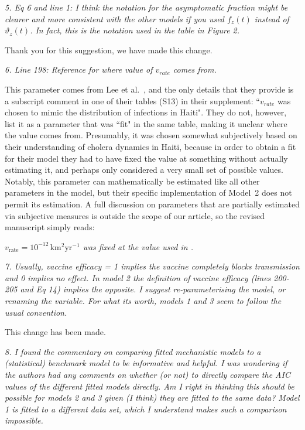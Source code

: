 \documentclass[11pt]{article}
\newcommand\report[1]{{\color{mygreen} \vspace{1mm}\hspace{0.25in}\parbox{6in}{\em #1}}}
\newcommand\article[1]{{\color{blue} \vspace{1mm}\hspace{0.25in}\parbox{6in}{\em #1}}}
\begin{document}
\report{5.
  Eq 6 and line 1: I think the notation for the asymptomatic fraction might be clearer and more consistent with the other models if you used $f_z(t)$ instead of $\vartheta_z(t)$. In fact, this is the notation used in the table in Figure 2.
}

Thank you for this suggestion, we have made this change.

\report{6.
  Line 198: Reference for where value of $v_{rate}$ comes from.
}

This parameter comes from Lee et al.~\cite{lee20}, and the only details that they provide is a subscript comment in one of their tables (S13) in their supplement: ``$v_{rate}$ was chosen to mimic the distribution of infections in Haiti".
They do not, however, list it as a parameter that was ``fit" in the same table, making it unclear where the value comes from.
Presumably, it was chosen somewhat subjectively based on their understanding of cholera dynamics in Haiti, because in order to obtain a fit for their model they had to have fixed the value at something without actually estimating it, and perhaps only considered a very small set of possible values. Notably, this parameter can mathematically be estimated like all other parameters in the model, but their specific implementation of Model~2 does not permit its estimation.
A full discussion on parameters that are partially estimated via subjective measures is outside the scope of our article, so the revised manuscript simply reads:

\article{$v_{\mathrm{rate}}= 10^{-12} \,\mbox{km$^2$yr$^{-1}$}$ was fixed at the value used in \cite{lee20}.}

\report{7.
  Usually, vaccine efficacy = 1 implies the vaccine completely blocks transmission and 0 implies no effect. In model 2 the definition of vaccine efficacy (lines 200-205 and Eq 14) implies the opposite. I suggest re-parameterising the model, or renaming the variable. For what its worth, models 1 and 3 seem to follow the usual convention.
}

This change has been made.

\report{8.
  I found the commentary on comparing fitted mechanistic models to a (statistical) benchmark model to be informative and helpful. I was wondering if the authors had any comments on whether (or not) to directly compare the AIC values of the different fitted models directly. Am I right in thinking this should be possible for models 2 and 3 given (I think) they are fitted to the same data? Model 1 is fitted to a different data set, which I understand makes such a comparison impossible.
}
\end{document}
